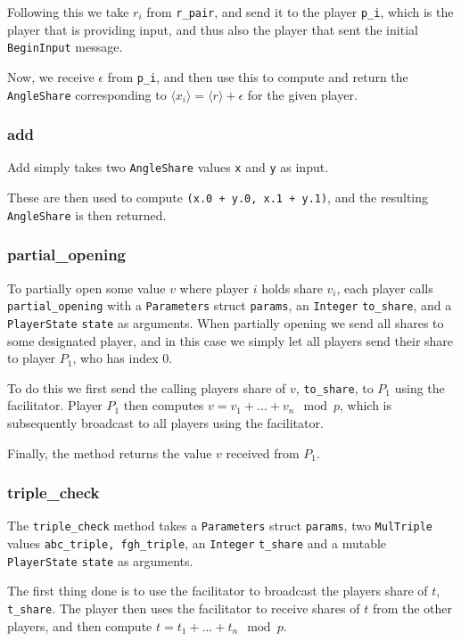 \documentclass[../main.tex]{subfiles}
\begin{document}
Following this we take $r_i$ from \lstinline{r_pair}, and send it to the player \lstinline{p_i}, which is the player that is providing input, and thus also the player that sent the initial \lstinline{BeginInput} message.

Now, we receive $\epsilon$ from \lstinline{p_i}, and then use this to compute and return the \lstinline{AngleShare} corresponding to $\langle x_i \rangle = \langle r \rangle + \epsilon$ for the given player.

\subsubsection{add}
Add simply takes two \lstinline{AngleShare} values \lstinline{x} and \lstinline{y} as input.

These are then used to compute \lstinline{(x.0 + y.0, x.1 + y.1)}, and the resulting \lstinline{AngleShare} is then returned.
\subsubsection{partial\_opening}
To partially open some value $v$ where player $i$ holds share $v_i$, each player calls \lstinline{partial_opening} with a \lstinline{Parameters} struct \lstinline{params}, an \lstinline{Integer} \lstinline{to_share}, and a \lstinline{PlayerState}  \lstinline{state} as arguments. When partially opening we send all shares to some designated player, and in this case we simply let all players send their share to player $P_1$, who has index $0$.

To do this we first send the calling players share of $v$, \lstinline{to_share}, to $P_1$ using the facilitator. Player $P_1$ then computes $v = v_1 + ... + v_n \mod p$, which is subsequently broadcast to all players using the facilitator.

Finally, the method returns the value $v$ received from $P_1$.

\subsubsection{triple\_check}
The \lstinline{triple_check} method takes a \lstinline{Parameters} struct \lstinline{params}, two \lstinline{MulTriple} values \lstinline{abc_triple, fgh_triple}, an \lstinline{Integer} \lstinline{t_share} and a mutable \lstinline{PlayerState} \lstinline{state} as arguments.

The first thing done is to use the facilitator to broadcast the players share of $t$, \lstinline{t_share}. The player then uses the facilitator to receive shares of $t$ from the other players, and then compute $t = t_1 + ... + t_n \mod p$.
\end{document}
